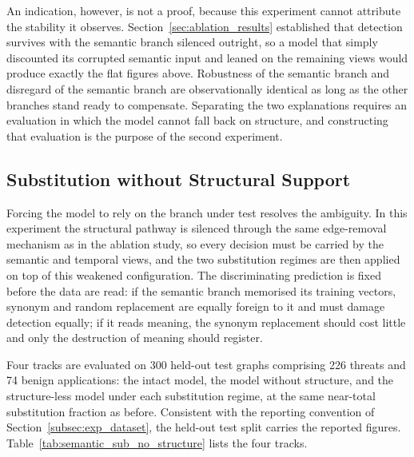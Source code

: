 \documentclass[%
    BCOR=10mm,
    DIV=13,
    toc=bibliography,
    toc=listof,
    oneside,
    12pt,
]{scrbook}
\begin{document}
An indication, however, is not a proof, because this experiment cannot
attribute the stability it observes.
Section~\ref{sec:ablation_results} established that detection survives with
the semantic branch silenced outright, so a model that simply discounted its
corrupted semantic input and leaned on the remaining views would produce
exactly the flat figures above. Robustness of the semantic branch and
disregard of the semantic branch are observationally identical as long as
the other branches stand ready to compensate. Separating the two
explanations requires an evaluation in which the model cannot fall back on
structure, and constructing that evaluation is the purpose of the second
experiment.

\subsection{Substitution without Structural Support}
\label{subsec:semantic_sub_no_structure}

Forcing the model to rely on the branch under test resolves the ambiguity.
In this experiment the structural pathway is silenced through the same
edge-removal mechanism as in the ablation study, so every decision must be
carried by the semantic and temporal views, and the two substitution regimes
are then applied on top of this weakened configuration. The discriminating
prediction is fixed before the data are read: if the semantic branch
memorised its training vectors, synonym and random replacement are equally
foreign to it and must damage detection equally; if it reads meaning, the
synonym replacement should cost little and only the destruction of meaning
should register.

Four tracks are evaluated on 300 held-out test graphs comprising 226 threats
and 74 benign applications: the intact model, the model without structure,
and the structure-less model under each substitution regime, at the same
near-total substitution fraction as before. Consistent with the reporting
convention of Section~\ref{subsec:exp_dataset}, the held-out test split
carries the reported figures.
Table~\ref{tab:semantic_sub_no_structure} lists the four tracks.
\end{document}

